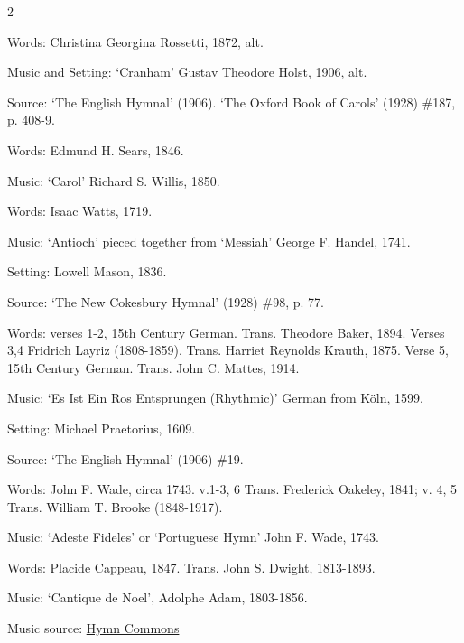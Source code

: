 \begin{multicols}{2}
\par\noindent
Words: Christina Georgina Rossetti, 1872, alt. 
\par\noindent
Music and Setting: `Cranham' Gustav Theodore Holst, 1906, alt. 
\par\noindent
Source: `The English Hymnal' (1906). `The Oxford Book of Carols' (1928) \#187, p. 408-9.


\par\noindent
Words: Edmund H. Sears, 1846.
\par\noindent
Music: `Carol' Richard S. Willis, 1850.


\par\noindent
Words: Isaac Watts, 1719.
\par\noindent
Music: `Antioch' pieced together from `Messiah' George F. Handel, 1741.
\par\noindent
Setting: Lowell Mason, 1836.
\par\noindent
Source: `The New Cokesbury Hymnal‎' (1928) \#98, p. 77.


\par\noindent
Words: verses 1-2, 15th Century German.  Trans. Theodore Baker, 1894. Verses 3,4 Fridrich Layriz (1808-1859).  Trans. Harriet Reynolds Krauth, 1875. Verse 5, 15th Century German.  Trans. John C. Mattes, 1914.
\par\noindent
Music: `Es Ist Ein Ros Entsprungen (Rhythmic)' German from Köln, 1599.
\par\noindent
Setting: Michael Praetorius, 1609.
\par\noindent
Source: `The English Hymnal' (1906) \#19.


\par\noindent
Words:  John F. Wade, circa 1743. v.1-3, 6 Trans. Frederick Oakeley, 1841; v. 4, 5 Trans. William T. Brooke (1848-1917). 
\par\noindent
Music: `Adeste Fideles' or `Portuguese Hymn' John F. Wade, 1743.


\par\noindent
Words: Placide Cappeau, 1847. Trans. John S. Dwight, 1813-1893.
\par\noindent
Music: `Cantique de Noel', Adolphe Adam, 1803-1856.
\par\noindent
Music source: \href{https://hymncommons.org}{Hymn Commons}



\end{multicols}

